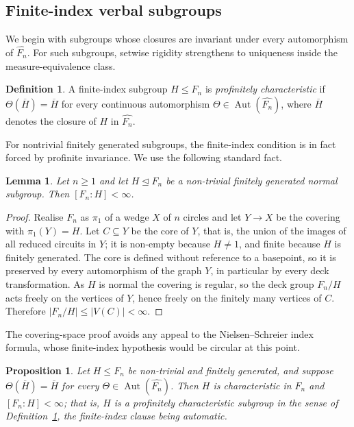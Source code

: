 \documentclass[11pt]{amsart}
\theoremstyle{plain}
\newtheorem{proposition}[theorem]{Proposition}
\newtheorem{lemma}[theorem]{Lemma}
\theoremstyle{definition}
\newtheorem{definition}[theorem]{Definition}
\newcommand{\Aut}{\operatorname{Aut}}
\begin{document}
\subsection{Finite-index verbal subgroups}\label{sec:verbal}


We begin with subgroups whose closures are invariant under every automorphism of
$\widehat{F_n}$. For such subgroups, setwise rigidity strengthens to uniqueness
inside the measure-equivalence class.

\begin{definition}\label{def:profchar}
A finite-index subgroup $H\le F_n$ is \emph{profinitely characteristic} if
$\Theta(\overline H)=\overline H$ for every continuous automorphism
$\Theta\in\Aut(\widehat{F_n})$, where $\overline H$ denotes the closure of $H$ in
$\widehat{F_n}$.
\end{definition}

For nontrivial finitely generated subgroups, the finite-index condition is in
fact forced by profinite invariance. We use the following standard fact.

\begin{lemma}\label{lem:normal-fi}
Let $n\ge1$ and let $H\trianglelefteq F_n$ be a non-trivial finitely generated
normal subgroup.  Then $[F_n:H]<\infty$.
\end{lemma}

\begin{proof}
Realise $F_n$ as $\pi_1$ of a wedge $X$ of $n$ circles and let $Y\to X$ be the
covering with $\pi_1(Y)=H$.  Let $C\subseteq Y$ be the core of $Y$, that is, the
union of the images of all reduced circuits in $Y$; it is non-empty because
$H\neq1$, and finite because $H$ is finitely generated.  The core is defined
without reference to a basepoint, so it is preserved by every automorphism of the
graph $Y$, in particular by every deck transformation.  As $H$ is normal the
covering is regular, so the deck group $F_n/H$ acts freely on the vertices of
$Y$, hence freely on the finitely many vertices of $C$.  Therefore
$|F_n/H|\le|V(C)|<\infty$.
\end{proof}

The covering-space proof avoids any appeal to the Nielsen--Schreier index
formula, whose finite-index hypothesis would be circular at this point.

\begin{proposition}\label{prop:fi-automatic}
Let $H\le F_n$ be non-trivial and finitely generated, and suppose
$\Theta(\overline H)=\overline H$ for every $\Theta\in\Aut(\widehat{F_n})$.  Then
$H$ is characteristic in $F_n$ and $[F_n:H]<\infty$; that is, $H$ is a profinitely
characteristic subgroup in the sense of Definition~\ref{def:profchar}, the
finite-index clause being automatic.
\end{proposition}
\end{document}
